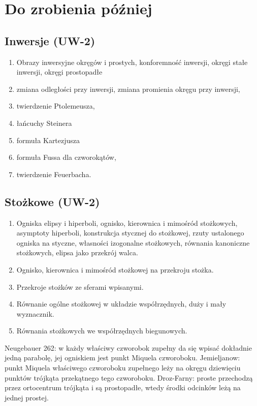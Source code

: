 
\section{Do zrobienia później}
\subsection{Inwersje (UW-2)}
\begin{enumerate}
	\item Obrazy inwersyjne okręgów i prostych, konforemność inwersji, okręgi stałe inwersji, okręgi prostopadłe
	\item zmiana odległości przy inwersji, zmiana promienia okręgu przy inwersji,
	\item twierdzenie Ptolemeusza,
	\item łańcuchy Steinera
	\item formuła Kartezjusza
	\item formuła Fussa dla czworokątów,
	\item twierdzenie Feuerbacha.
\end{enumerate}

\subsection{Stożkowe (UW-2)}
\begin{enumerate}
	\item Ogniska elipsy i hiperboli, ognisko, kierownica i mimośród stożkowych, asymptoty hiperboli, konstrukcja stycznej do stożkowej, rzuty ustalonego ogniska na styczne, własności izogonalne stożkowych, równania kanoniczne stożkowych, elipsa jako przekrój walca.
	\item Ognisko, kierownica i mimośród stożkowej na przekroju stożka.
	\item Przekroje stożków ze sferami wpisanymi.
	\item Równanie ogólne stożkowej w układzie współrzędnych, duży i mały wyznacznik.
	\item Równania stożkowych we współrzędnych biegunowych.
\end{enumerate}

Neugebauer 262: w każdy właściwy czworobok zupełny da się wpisać dokładnie jedną parabolę, jej ogniskiem jest punkt Miquela czworoboku.
Jemieljanow: punkt Miquela właściwego czworoboku zupełnego leży na okręgu dziewięciu punktów trójkąta przekątnego tego czworoboku.
Droz-Farny: proste przechodzą przez ortocentrum trójkąta i są prostopadłe, wtedy środki odcinków leżą na jednej prostej.

